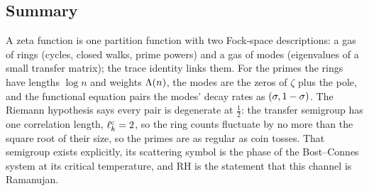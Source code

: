 \subsection{Summary}

A zeta function is one partition function with two Fock-space descriptions: a gas of
rings (cycles, closed walks, prime powers) and a gas of modes (eigenvalues of a small
transfer matrix); the trace identity links them. For the primes the rings have lengths
$\log n$ and weights $\Lambda(n)$, the modes are the zeros of $\zeta$ plus the pole, and
the functional equation pairs the modes' decay rates as $(\sigma,1-\sigma)$. The Riemann
hypothesis says every pair is degenerate at $\tfrac12$: the transfer semigroup has one
correlation length, $\ell^{\mathrm{c}}_{k} = 2$, so the ring counts fluctuate by no more than
the square root of their size, so the primes are as regular as coin tosses. That
semigroup exists explicitly, its scattering symbol is the phase of the Bost--Connes
system at its critical temperature, and RH is the statement that this channel is
Ramanujan.
